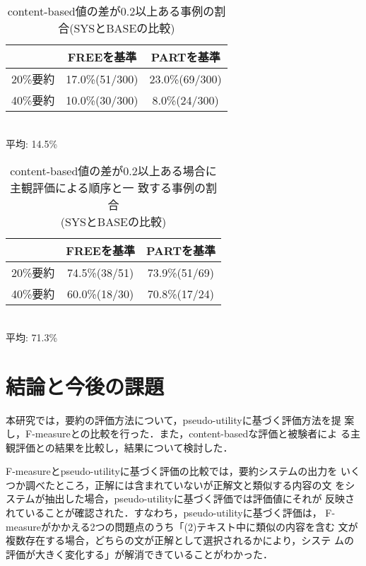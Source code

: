 \begin{table}[t]
\caption{content-based値の差が0.2以上ある事例の割合(SYSとBASEの比較)\label{table:cbcomp31}}
\begin{center}
\begin{tabular}{|c|c|c|}\hline
    & FREEを基準    & PARTを基準    \\ \hline\hline
20\%要約 & 17.0\%(51/300) & 23.0\%(69/300) \\ \hline
40\%要約 & 10.0\%(30/300) & 8.0\%(24/300) \\ \hline
\end{tabular}\\
\vspace{0.1cm}
平均: 14.5\%
\vspace{-0.7cm}
\end{center}
\end{table}

\begin{table}[t]
\caption{content-based値の差が0.2以上ある場合に主観評価による順序と一
致する事例の割合\\
(SYSとBASEの比較)\label{table:cbcomp32}}
\begin{center}
\begin{tabular}{|c|c|c|}\hline
    & FREEを基準    & PARTを基準    \\ \hline\hline
20\%要約 & 74.5\%(38/51) & 73.9\%(51/69) \\ \hline
40\%要約 & 60.0\%(18/30) & 70.8\%(17/24) \\ \hline
\end{tabular}\\
\vspace{0.1cm}
平均: 71.3\%
\vspace{-0.7cm}
\end{center}
\end{table}

\section{結論と今後の課題}

本研究では，要約の評価方法について，pseudo-utilityに基づく評価方法を提
案し，F-measureとの比較を行った．また，content-basedな評価と被験者によ
る主観評価との結果を比較し，結果について検討した．

F-measureとpseudo-utilityに基づく評価の比較では，要約システムの出力を
いくつか調べたところ，正解には含まれていないが正解文と類似する内容の文
をシステムが抽出した場合，pseudo-utilityに基づく評価では評価値にそれが
反映されていることが確認された．すなわち，pseudo-utilityに基づく評価は，
F-measureがかかえる2つの問題点のうち「(2)テキスト中に類似の内容を含む
文が複数存在する場合，どちらの文が正解として選択されるかにより，システ
ムの評価が大きく変化する」が解消できていることがわかった．

